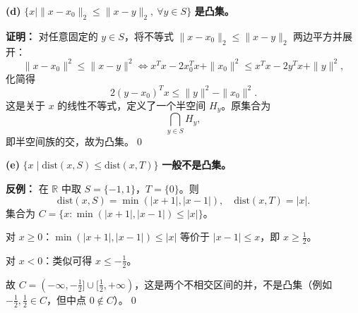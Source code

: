 \documentclass[12pt,a4paper]{article}
\begin{document}
\textbf{(d)} $\{x\mid \|x-x_0\|_2\le\|x-y\|_2,\ \forall y\in S\}$ \textbf{是凸集。}

\textbf{证明：} 对任意固定的 $y\in S$，将不等式 $\|x-x_0\|_2\le\|x-y\|_2$ 两边平方并展开：
\[
  \|x-x_0\|^2 \le \|x-y\|^2
  \iff x^Tx - 2x_0^Tx + \|x_0\|^2 \le x^Tx - 2y^Tx + \|y\|^2,
\]
化简得
\[
  2(y-x_0)^Tx \le \|y\|^2 - \|x_0\|^2.
\]
这是关于 $x$ 的线性不等式，定义了一个半空间 $H_y$。原集合为
\[
  \bigcap_{y\in S} H_y,
\]
即半空间族的交，故为凸集。\qed

\textbf{(e)} $\{x\mid \mathrm{dist}(x,S)\le\mathrm{dist}(x,T)\}$ \textbf{一般不是凸集。}

\textbf{反例：} 在 $\mathbb{R}$ 中取 $S=\{-1,1\}$，$T=\{0\}$。则
\[
  \mathrm{dist}(x,S)=\min(|x+1|,|x-1|),\quad \mathrm{dist}(x,T)=|x|.
\]
集合为 $C=\{x:\min(|x+1|,|x-1|)\le|x|\}$。

对 $x\ge0$：$\min(|x+1|,|x-1|)\le|x|$ 等价于 $|x-1|\le x$，即 $x\ge\tfrac{1}{2}$。

对 $x<0$：类似可得 $x\le-\tfrac{1}{2}$。

故 $C=(-\infty,-\tfrac{1}{2}]\cup[\tfrac{1}{2},+\infty)$，这是两个不相交区间的并，不是凸集（例如 $-\tfrac{1}{2},\tfrac{1}{2}\in C$，但中点 $0\notin C$）。\qed
\end{document}

